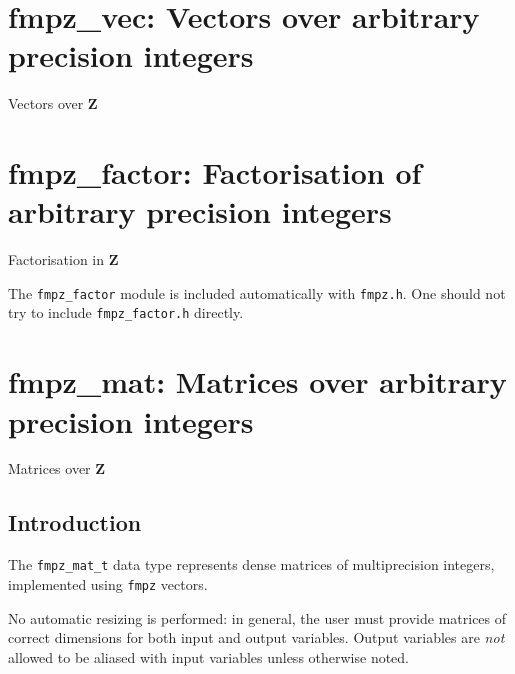 \documentclass[a4paper,10pt]{book}
\newcommand{\Z}{\mathbf{Z}}%
\newcommand{\code}{\lstinline}
\begin{document}
{{%

\chapter{fmpz\_vec: Vectors over arbitrary precision integers}
\epigraph{Vectors over $\Z$}{}




\chapter{fmpz\_factor: Factorisation of arbitrary precision integers}
\epigraph{Factorisation in $\Z$}{}

The \code{fmpz_factor} module is included automatically with
\code{fmpz.h}. One should not try to include \code{fmpz_factor.h}
directly.




\chapter{fmpz\_mat: Matrices over arbitrary precision integers}
\epigraph{Matrices over $\Z$}{}

\section{Introduction}

The \code{fmpz_mat_t} data type represents dense matrices of multiprecision
integers, implemented using \code{fmpz} vectors.

No automatic resizing is performed: in general, the user must provide
matrices of correct dimensions for both input and output variables. Output
variables are \emph{not} allowed to be aliased with input variables unless
otherwise noted.

}}
\end{document}
